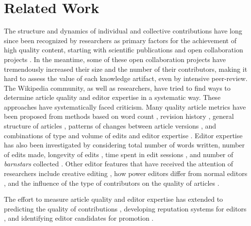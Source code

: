 \section{Related Work}
The structure and dynamics of individual and collective contributions have long since been recognized by researchers as primary factors for the achievement of high quality content, starting with scientific publications \cite{newman2001} and open collaboration projects \cite{bryant2005}. In the meantime, some of these open collaboration projects have tremendously increased their size and the number of their contributors, making it hard to assess the value of each knowledge artifact, even by intensive peer-review. The Wikipedia community, as well as researchers, have tried to find ways to determine article quality and editor expertise in a systematic way. These approaches have systematically faced criticism. Many quality article metrics have been proposed from methods based on word count \cite{blumenstock2008sizematters}, revision history \cite{hu2007articlequality},  general structure of articles \cite{wang2013tell}, patterns of changes between article versions \cite{woehner2009}, and combinations of type and volume of edits and editor expertise \cite{kane2011}. Editor expertise has also been investigated by considering  total number of words written, number of edits made, longevity of edits \cite{adler2008measuringauthor}, time spent in edit sessions \cite{geiger2013}, and number of {\it barnstars} collected \cite{Kriplean2008}. Other editor features that have received the attention of researchers include creative editing \cite{iba2010}, how power editors differ from normal editors \cite{panciera2009}, and the influence of the type of contributors on the quality of articles \cite{stein2007}.

The effort to measure article quality and editor expertise has extended to predicting the quality of contributions \cite{druck2008learning,zeng2006computingtrust}, developing reputation systems for editors \cite{adler2007contentdriven}, and identifying editor candidates for promotion \cite{burke2008taking}.


